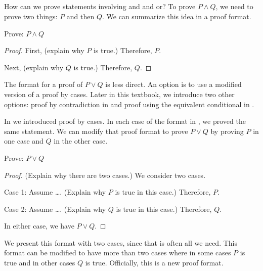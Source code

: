 \subsection{\subpffandor}
\label{sub_pff_and_or}

How can we prove statements involving and and or? To prove $P \land Q$, we need to prove two things: $P$ and then $Q$.  We can summarize this idea in a proof format.

\begin{pff}
\label{pff_and}
    Prove: $P \land Q$
        \begin{proof}            
            First, (explain why $P$ is true.)  Therefore, $P$.

            Next, (explain why $Q$ is true.) Therefore, $Q$.
        \end{proof}
\end{pff}

The format for a proof of $P \lor Q$ is less direct. An option is to use a modified version of a proof by cases. Later in this textbook, we introduce two other options: proof by contradiction in  and proof using the equivalent conditional in .

In  we introduced proof by cases.  In each case of the format in , we proved the same statement.  We can modify that proof format to prove $P \lor Q$ by proving $P$ in one case and $Q$ in the other case.

\begin{pff}
\label{pff_or_by_cases}
    Prove: $P \lor Q$
        \begin{proof}   
            (Explain why there are two cases.)  We consider two cases.

            Case 1: Assume \ldots. (Explain why $P$ is true in this case.)  Therefore, $P$.

            Case 2: Assume \ldots.  (Explain why $Q$ is true in this case.) Therefore, $Q$.

            In either case, we have $P \lor Q$.
        \end{proof}
\end{pff}

We present this format with two cases, since that is often all we need.  This format can be modified to have more than two cases where in some cases $P$ is true and in other cases $Q$ is true. Officially, this is a new proof format.

